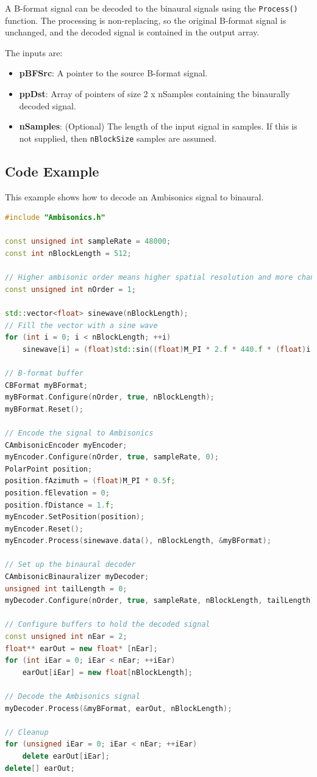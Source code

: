 \documentclass[12pt]{report}
\newcommand{\code}[1]{\texttt{#1}}
\begin{document}
A B-format signal can be decoded to the binaural signals using the \code{Process()} function. The processing is non-replacing, so the original B-format signal is unchanged, and the decoded signal is contained in the output array.

The inputs are:
\begin{itemize}
    \item \textbf{pBFSrc}: A pointer to the source B-format signal.
    \item \textbf{ppDst}: Array of pointers of size 2 x nSamples containing the binaurally decoded signal.
    \item \textbf{nSamples}: (Optional) The length of the input signal in samples. If this is not supplied, then \code{nBlockSize} samples are assumed.
\end{itemize}

\subsection{Code Example}

This example shows how to decode an Ambisonics signal to binaural.

\begin{lstlisting}[language=C++]
#include "Ambisonics.h"

const unsigned int sampleRate = 48000;
const int nBlockLength = 512;

// Higher ambisonic order means higher spatial resolution and more channels required
const unsigned int nOrder = 1;

std::vector<float> sinewave(nBlockLength);
// Fill the vector with a sine wave
for (int i = 0; i < nBlockLength; ++i)
    sinewave[i] = (float)std::sin((float)M_PI * 2.f * 440.f * (float)i / (float)sampleRate);

// B-format buffer
CBFormat myBFormat;
myBFormat.Configure(nOrder, true, nBlockLength);
myBFormat.Reset();

// Encode the signal to Ambisonics
CAmbisonicEncoder myEncoder;
myEncoder.Configure(nOrder, true, sampleRate, 0);
PolarPoint position;
position.fAzimuth = (float)M_PI * 0.5f;
position.fElevation = 0;
position.fDistance = 1.f;
myEncoder.SetPosition(position);
myEncoder.Reset();
myEncoder.Process(sinewave.data(), nBlockLength, &myBFormat);

// Set up the binaural decoder
CAmbisonicBinauralizer myDecoder;
unsigned int tailLength = 0;
myDecoder.Configure(nOrder, true, sampleRate, nBlockLength, tailLength);

// Configure buffers to hold the decoded signal
const unsigned int nEar = 2;
float** earOut = new float* [nEar];
for (int iEar = 0; iEar < nEar; ++iEar)
    earOut[iEar] = new float[nBlockLength];

// Decode the Ambisonics signal
myDecoder.Process(&myBFormat, earOut, nBlockLength);

// Cleanup
for (unsigned iEar = 0; iEar < nEar; ++iEar)
    delete earOut[iEar];
delete[] earOut;
\end{lstlisting}
\end{document}
